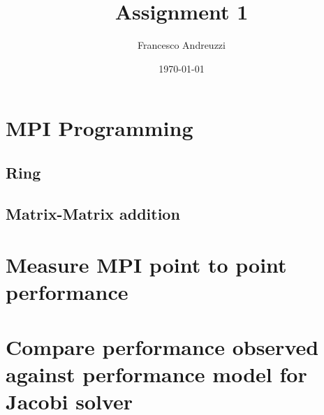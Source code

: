 \documentclass{article}
\title{Assignment 1}
\author{Francesco Andreuzzi}
\date{\today}
\begin{document}
\maketitle

\section{MPI Programming}

\subsection{Ring}

\subsection{Matrix-Matrix addition}

\section{Measure MPI point to point performance}

\section{Compare performance observed against performance model for Jacobi solver}
\end{document}
